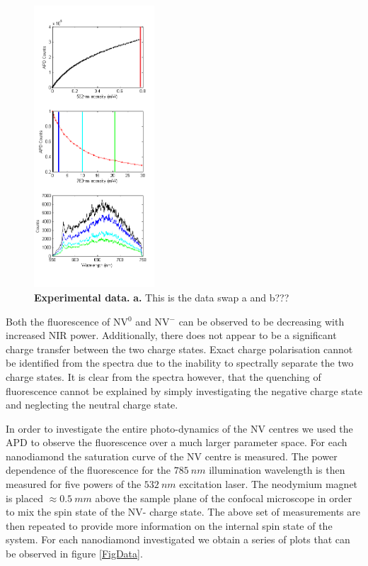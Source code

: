 \documentclass[prl]{revtex4}
\begin{document}
\begin{figure}[H]
  \centering
  \includegraphics[width=0.4\textwidth]{Spectras.png} 
 \caption{\textbf{Experimental data.} \textbf{a.} This is the data swap a and b???} \label{FigSpectra}
\end{figure}

Both the fluorescence of NV$^0$ and NV$^-$ can be observed to be decreasing with increased NIR power. Additionally, there does not appear to be a significant charge transfer between the two charge states. Exact charge polarisation cannot be identified from the spectra due to the inability to spectrally separate the two charge states. It is clear from the spectra however, that the quenching of fluorescence cannot be explained by simply investigating the negative charge state and neglecting the neutral charge state.

In order to investigate the entire photo-dynamics of the NV centres we used the APD to observe the fluorescence over a much larger parameter space. For each nanodiamond the saturation curve of the NV centre is measured. The power dependence of the fluorescence for the $\SI{785}{nm}$ illumination wavelength is then measured for five powers of the $\SI{532}{nm}$ excitation laser. The neodymium magnet is placed $\approx \SI{0.5}{mm}$ above the sample plane of the confocal microscope in order to mix the spin state of the NV- charge state. The above set of measurements are then repeated to provide more information on the internal spin state of the system. For each nanodiamond investigated we obtain a series of plots that can be observed in figure \ref{FigData}.
\end{document}
